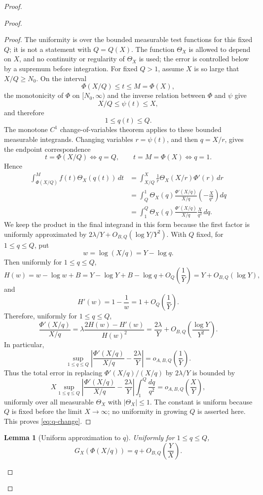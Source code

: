 \documentclass[11pt]{article}
\newtheorem{lemma}{Lemma}
\begin{document}
\begin{proof}
\begin{proof}
\begin{proof}
The uniformity is over the bounded measurable test functions for this fixed $Q$; it is not a
statement with $Q=Q(X)$. The function $\Theta_X$ is allowed to depend on $X$, and no continuity or
regularity of $\Theta_X$ is used; the error is controlled below by a supremum before integration.
For fixed $Q>1$, assume $X$ is so large that $X/Q\ge N_0$. On the interval
\[
\Phi(X/Q)\le t\le M=\Phi(X),
\]
the monotonicity of $\Phi$ on $[N_0,\infty)$ and the inverse relation between $\Phi$ and
$\psi$ give
\[
X/Q\le\psi(t)\le X,
\]
and therefore
\[
1\le q(t)\le Q.
\]
The monotone $C^1$ change-of-variables theorem applies to these bounded measurable integrands.
Changing variables $r=\psi(t)$, and then $q=X/r$, gives the endpoint correspondence
\[
t=\Phi(X/Q)\Longleftrightarrow q=Q,
\qquad
 t=M=\Phi(X)\Longleftrightarrow q=1.
\]
Hence
\[
\begin{aligned}
\int_{\Phi(X/Q)}^M f(t)\Theta_X(q(t))\,dt
&=
\int_{X/Q}^X
\frac1r \Theta_X(X/r)\Phi'(r)\,dr \\
&=
\int_Q^1
\Theta_X(q)
\frac{\Phi'(X/q)}{X/q}
\left(-\frac{X}{q^2}\right)dq \\
&=
\int_1^Q
\Theta_X(q)
\frac{\Phi'(X/q)}{X/q}
\frac{X}{q^2}\,dq.
\end{aligned}
\]
We keep the product in the final integrand in this form because the first factor is uniformly
approximated by $2\lambda/Y+O_{B,Q}(\log Y/Y^2)$.
With $Q$ fixed, for $1\le q\le Q$, put
\[
w=\log(X/q)=Y-\log q.
\]
Then uniformly for $1\le q\le Q$,
\[
H(w)=w-\log w+B
=Y-\log Y+B-\log q+O_Q\left(\frac1Y\right)
=Y+O_{B,Q}(\log Y),
\]
and
\[
H'(w)=1-\frac1w=1+O_Q\left(\frac1Y\right).
\]
Therefore, uniformly for $1\le q\le Q$,
\[
\frac{\Phi'(X/q)}{X/q}
=
\lambda\frac{2H(w)-H'(w)}{H(w)^2}
=
\frac{2\lambda}{Y}
+
O_{B,Q}\left(\frac{\log Y}{Y^2}\right).
\]
In particular,
\[
\sup_{1\le q\le Q}
\left|
\frac{\Phi'(X/q)}{X/q}-\frac{2\lambda}{Y}
\right|
=
o_{A,B,Q}\left(\frac1Y\right).
\]
Thus the total error in replacing $\Phi'(X/q)/(X/q)$ by $2\lambda/Y$ is bounded by
\[
X
\sup_{1\le q\le Q}
\left|
\frac{\Phi'(X/q)}{X/q}-\frac{2\lambda}{Y}
\right|
\int_1^Q\frac{dq}{q^2}
=
o_{A,B,Q}\left(\frac XY\right),
\]
uniformly over all measurable $\Theta_X$ with $|\Theta_X|\le1$. The constant is uniform because $Q$ is
fixed before the limit $X\to\infty$; no uniformity in growing $Q$ is asserted here. This proves
\eqref{eq:q-change}.
\end{proof}

\begin{lemma}[Uniform approximation to $q$]
Uniformly for $1\le q\le Q$,
\[
G_X(\Phi(X/q))=q+O_{B,Q}\left(\frac YX\right).
\tag{37}\label{eq:GX-q-uniform}
\]
\end{lemma}


\end{proof}
\end{proof}
\end{document}
